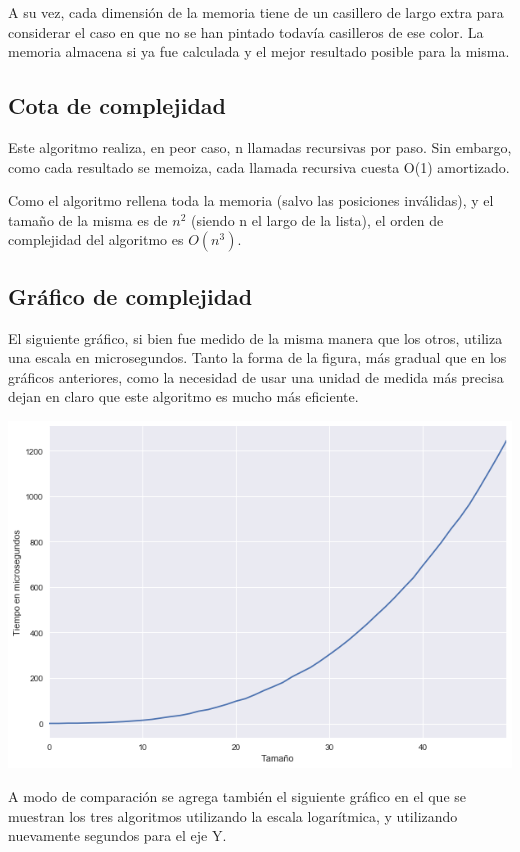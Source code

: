 	A su vez, cada dimensión de la memoria tiene de un casillero de largo extra para considerar el caso en que no se han pintado todavía casilleros de ese color. La memoria almacena si ya fue calculada y el mejor resultado posible para la misma.

	\subsection{Cota de complejidad}

	Este algoritmo realiza, en peor caso, n llamadas recursivas por paso. Sin embargo, como cada resultado se memoiza, cada llamada recursiva cuesta O(1) amortizado.

	Como el algoritmo rellena toda la memoria (salvo las posiciones inválidas), y el tamaño de la misma es de $n^2$ (siendo n el largo de la lista), el orden de complejidad del algoritmo es $O(n^3)$.

	\pagebreak
	\subsection{Gráfico de complejidad}

	El siguiente gráfico, si bien fue medido de la misma manera que los otros, utiliza una escala en microsegundos. Tanto la forma de la figura, más gradual que en los gráficos anteriores, como la necesidad de usar una unidad de medida más precisa dejan en claro que este algoritmo es mucho más eficiente.

	\begin{center}
	\includegraphics[width=.8\textwidth]{ej3.png}
	\end{center}

	A modo de comparación se agrega también el siguiente gráfico en el que se muestran los tres algoritmos utilizando la escala logarítmica, y utilizando nuevamente segundos para el eje Y.

